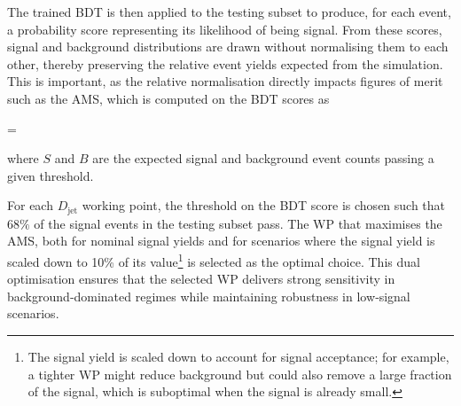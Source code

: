 The trained BDT is then applied to the testing subset to produce, for each event, a probability score representing its likelihood of being signal. From these scores, signal and background distributions are drawn without normalising them to each other, thereby preserving the relative event yields expected from the simulation. This is important, as the relative normalisation directly impacts figures of merit such as the \ac{AMS}, which is computed on the BDT scores as

\begin{equation_pad}
 =  
\end{equation_pad}

where $S$ and $B$ are the expected signal and background event counts passing a given threshold.  

For each $D_{\text{jet}}$ working point, the threshold on the BDT score is chosen such that $68\%$ of the signal events in the testing subset pass. The WP that maximises the AMS, both for nominal signal yields and for scenarios where the signal yield is scaled down to 10\% of its value\footnote{The signal yield is scaled down to account for signal acceptance; for example, a tighter WP might reduce background but could also remove a large fraction of the signal, which is suboptimal when the signal is already small.} is selected as the optimal choice. This dual optimisation ensures that the selected WP delivers strong sensitivity in background‑dominated regimes while maintaining robustness in low‑signal scenarios.

